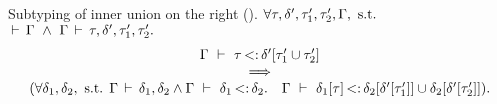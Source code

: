 \begin{lemma}{Subtyping of inner union on the right
    (\textbf{}).}%
\label{lem:sub-inner-union-right:app}
    $\forall \tau, \delta', \tau'_1, \tau'_2, \Gamma, \text{ s.t. }$\\
    $\,\vdash\,\Gamma\ \land\ \Gamma\,\vdash\,\tau, \delta', \tau'_1, \tau'_2.$
    \[
        \begin{array}{ccc}
        \Gamma\ \vdash\ \tau \operatorname{<:} \delta'[\tau'_1 \cup \tau'_2]\\
        \quad\implies\quad\\
        (\forall \delta_1, \delta_2, \text{ s.t. }
        \Gamma\,\vdash\,\delta_1, \delta_2 \land
        \Gamma\ \vdash\ \delta_1 \operatorname{<:} \delta_2.\quad
        \Gamma\ \vdash\ \delta_1[\tau] \operatorname{<:} \delta_2[\delta'[\tau'_1]] \cup \delta_2[\delta'[\tau'_2]]
            ).
        \end{array}
    \]
\end{lemma}
